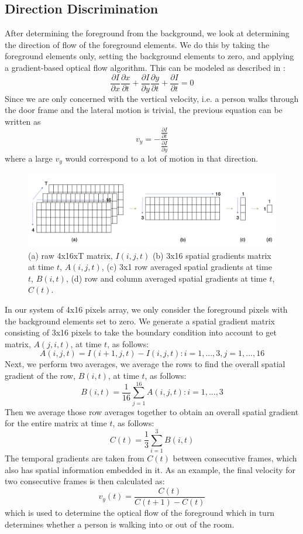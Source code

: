 \documentclass[12pt,oneside]{article} %
\begin{document}
\subsection{Direction Discrimination}
After determining the foreground from the background, we look at determining the direction of flow of the foreground elements. We do this by taking the foreground elements only, setting the background elements to zero, and applying a gradient-based optical flow algorithm. This can be modeled as described in \cite{Smith97}:
$$\frac{\partial I}{\partial x}\frac{\partial x}{\partial t}+\frac{\partial I}{\partial y}\frac{\partial y}{\partial t} + \frac{\partial I}{\partial t}=0$$
Since we are only concerned with the vertical velocity, i.e. a person walks through the door frame and the lateral motion is trivial, the previous equation can be written as
$$v_y = - \frac{\frac{\partial I}{\partial t}}{\frac{\partial I}{\partial y}}$$
where a large $v_y $ would correspond to a lot of motion in that direction. 
\begin{figure}[!htb]
\centering
\includegraphics[scale=0.3]{images/matrix.png}
\caption{(a) raw 4x16xT matrix, $I(i,j,t)$ (b) 3x16 spatial gradients matrix at time $t$, $A(i,j,t)$, (c) 3x1 row averaged spatial gradients at time $t$, $B(i,t)$, (d) row and column averaged spatial gradients at time $t$, $C(t)$.}
\label{matrix}
\end{figure}
In our system of 4x16 pixels array, we only consider the foreground pixels with the background elements set to zero. We generate a spatial gradient matrix consisting of 3x16 pixels to take the boundary condition into account to get matrix, $A(j,i,t)$, at time $t$, as follows: $$A(i,j,t) = I(i+1,j,t) - I(i,j,t) : i = 1, . . ., 3, j = 1, . . ., 16$$ Next, we perform two averages, we average the rows to find the overall spatial gradient of the row, $B(i,t)$, at time $t$, as follows: $$B(i,t) = \frac{1}{16}\sum_{j=1}^{16}A(i,j,t) : i = 1, . . .,3$$ Then we average those row averages together to obtain an overall spatial gradient for the entire matrix at time $t$, as follows: $$C(t) = \frac{1}{3}\sum_{i=1}^{3}B(i,t)$$ The temporal gradients are taken from $C(t)$ between consecutive frames, which also has spatial information embedded in it. As an example, the final velocity for two consecutive frames is then calculated as: $$v_y(t) = \frac{C(t)}{C(t+1)-C(t)}$$ which is used to determine the optical flow of the foreground which in turn determines whether a person is walking into or out of the room. 
\end{document}
